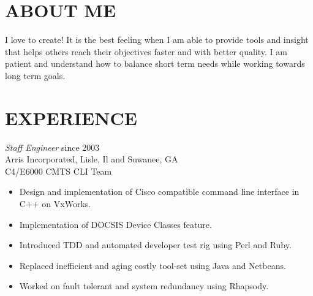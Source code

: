 \documentclass[line,margin]{res}
\begin{document}
\address{2910 Saddlebrook Glen Dr.}
\address{Cumming, GA 30041}

\begin{resume}
\section{ABOUT ME} I love to create!  It is the best feeling when I am able to provide tools and insight that helps others 
                reach their objectives faster and with better quality. I am patient and understand how to balance short
                term needs while working towards long term goals.

\section{EXPERIENCE} {\sl Staff Engineer} \hfill since 2003 \\
                Arris Incorporated, Lisle, Il and Suwanee, GA \\
                C4/E6000 CMTS CLI Team
                 \begin{itemize}  \itemsep -2pt %
                 \item Design and implementation of Cisco compatible command line interface in C++ on VxWorks.
                 \item Implementation of DOCSIS Device Classes feature.
                 \item Introduced TDD and automated developer test rig using Perl and Ruby.
                 \item Replaced inefficient and aging costly tool-set using Java and Netbeans.
                 \item Worked on fault tolerant and system redundancy using Rhapsody.
                 \end{itemize}


\end{resume}
\end{document}
